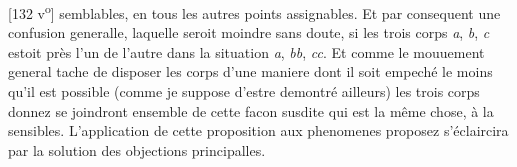 [132 v\textsuperscript{o}] semblables, en tous les autres points assignables. Et par consequent une confusion generalle, laquelle seroit moindre sans doute, si les trois corps \textit{a}, \textit{b}, \textit{c} estoit pr\`{e}s l'un de l'autre dans la situation \textit{a}, \textit{bb}, \textit{cc}. Et comme le mouuement general tache de disposer les corps d'une maniere dont il soit empech\'{e} le moins qu'il est possible (comme je suppose d'estre demontr\'{e} ailleurs) les trois corps donnez se joindront ensemble de cette facon susdite  qui est la même chose,  \`{a} la  sensibles.
\pend 
\pstart L'application de cette proposition aux phenomenes proposez s'\'{e}claircira par la solution des objections principalles.\pend 
